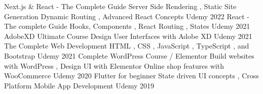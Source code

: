 
\begin{cvhonors}
\cvhonor
  {Next.js \& React - The Complete Guide} %
  {Server Side Rendering , Static Site Generation \newline Dynamic Routing , Advanced React Concepts} %
  {Udemy} %
  {2022} %
\cvhonor
  {React - The complete Guide} %
  {Hooks, Components , React Routing , States} %
  {Udemy} %
  {2021} %
\cvhonor
  {AdobeXD Ultimate Course} %
  {Design User Interfaces with Adobe XD} %
  {Udemy} %
  {2021} %
\cvhonor
  {The Complete Web Development} %
  {HTML , CSS , JavaScript , TypeScript , and Bootstrap} %
  {Udemy} %
  {2021} %
\cvhonor
  {Complete WordPress Course / Elementor} %
  {Build websites with WordPress , Design UI with Elementor \newline Online shop features with WooCommerce} %
  {Udemy} %
  {2020} %
\cvhonor
  {Flutter for beginner} %
  {State driven UI concepts , Cross Platform Mobile App Development} %
  {Udemy} %
  {2019} %
\end{cvhonors}
